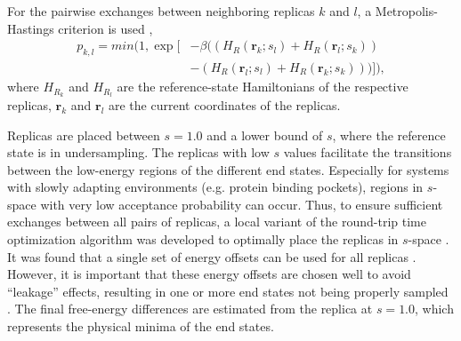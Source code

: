 For the pairwise exchanges between neighboring replicas $k$ and $l$, a Metropolis-Hastings criterion \cite{Hastings1970} is used \cite{Sidler2016,Sugita2000},
\begin{equation}
    \begin{split}
    p_{k,l} = min\bigg(1, \exp \Big[
                &-\beta \big((H_{R}(\textbf{r}_k; s_l)+H_{R}(\textbf{r}_l; s_k))\\
                &-(H_{R}(\textbf{r}_l; s_l)+H_{R}(\textbf{r}_k; s_k))\big)  \Big] \bigg) ,
    \end{split}
\end{equation}
where $H_{R_k}$ and $H_{R_l}$ are the reference-state Hamiltonians of the respective replicas, $\textbf{r}_k$ and $\textbf{r}_l$ are the current coordinates of the replicas.

Replicas are placed between $s=1.0$ and a lower bound of $s$, where the reference state is in undersampling. The replicas with low $s$ values facilitate the transitions between the low-energy regions of the  different end states. Especially for systems with slowly adapting environments (e.g. protein binding pockets), regions in $s$-space with very low acceptance probability can occur. Thus, to ensure sufficient exchanges between all pairs of replicas, a local variant of the round-trip time optimization algorithm \cite{Katzgraber2006, Nadler2008} was developed to optimally place the replicas in $s$-space \cite{Sidler2017}.
It was found that a single set of energy offsets can be used for all replicas \cite{Sidler2016}. However, it is important that these energy offsets are chosen well to avoid ``leakage'' effects, resulting in one or more end states not being properly sampled \cite{Sidler2016}.
The final free-energy differences are estimated from the replica at $s=1.0$, which represents the physical minima of the end states.

